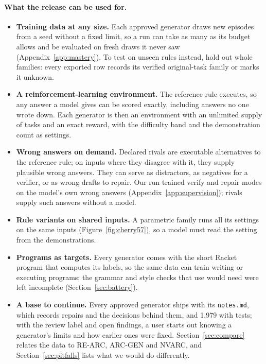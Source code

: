 \documentclass[11pt]{article}
\begin{document}
\paragraph{What the release can be used for.}
\begin{itemize}[nosep]
  \item \textbf{Training data at any size.} Each approved generator draws new
  episodes from a seed without a fixed limit, so a run can take as many as its
  budget allows and be evaluated on fresh draws it never saw
  (Appendix~\ref{app:mastery}). To test on unseen rules instead, hold out
  whole families: every exported row records its verified original-task
  family or marks it unknown.
  \item \textbf{A reinforcement-learning environment.} The reference rule
  executes, so any answer a model gives can be scored exactly, including
  answers no one wrote down. Each generator is then an environment with an
  unlimited supply of tasks and an exact reward, with the difficulty band and
  the demonstration count as settings.
  \item \textbf{Wrong answers on demand.} Declared rivals are executable
  alternatives to the reference rule; on inputs where they disagree with it,
  they supply plausible wrong answers. They can serve as
  distractors, as negatives for a verifier, or as wrong drafts to repair. Our
  run trained verify and repair modes on the model's own wrong answers
  (Appendix~\ref{app:supervision}); rivals supply such answers without a model.
  \item \textbf{Rule variants on shared inputs.} A parametric family runs all
  its settings on the same inputs (Figure~\ref{fig:cherry57}), so a model must
  read the setting from the demonstrations.
  \item \textbf{Programs as targets.} Every generator comes with the short
  Racket program that computes its labels, so the same data can train writing or executing
  programs; the grammar and style checks that use would need were left
  incomplete (Section~\ref{sec:battery}).
  \item \textbf{A base to continue.} Every approved generator ships with its
  \texttt{notes.md}, which records repairs and the decisions behind them,
  and 1,979 with tests; with the review label and open findings, a user
  starts out knowing a generator's limits and how earlier ones were fixed.
  Section~\ref{sec:compare} relates the data to RE-ARC, ARC-GEN and NVARC, and
  Section~\ref{sec:pitfalls} lists what we would do differently.
\end{itemize}
\end{document}
